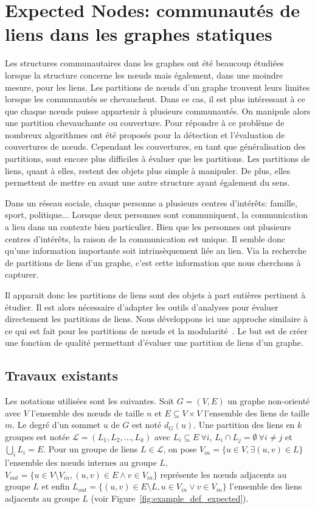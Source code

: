\chapter{Expected Nodes: communautés de liens dans les graphes statiques}
\minitoc

Les structures communautaires dans les graphes ont été beaucoup étudiées lorsque la structure concerne les n\oe uds mais également, dans une moindre mesure, pour les liens.
Les partitions de n\oe uds d'un graphe trouvent leurs limites lorsque les communautés se chevauchent.
Dans ce cas, il est plus intéressant à ce que chaque n\oe uds puisse appartenir à plusieurs communautés.
On manipule alors une partition chevauchante ou couverture.
Pour répondre à ce problème de nombreux algorithmes ont été proposés pour la détection et l'évaluation de couvertures de n\oe uds.
Cependant les couvertures, en tant que généralisation des partitions, sont encore plus difficiles à évaluer que les partitions.
Les partitions de liens, quant à elles, restent des objets plus simple à manipuler.
De plus, elles permettent de mettre en avant une autre structure ayant également du sens.

Dans un réseau sociale, chaque personne a plusieurs centres d'intérêts: famille, sport, politique...
Lorsque deux personnes sont communiquent, la communication a lieu dans un contexte bien particulier.
Bien que les personnes ont plusieurs centres d'intérêts, la raison de la communication est unique.
Il semble donc qu'une information importante soit intrinsèquement liée au lien.
Via la recherche de partitions de liens d'un graphe, c'est cette information que nous cherchons à capturer.

Il apparait donc les partitions de liens sont des objets à part entières pertinent à étudier.
Il est alors nécessaire d'adapter les outils d'analyses pour évaluer directement les partitions de liens.
Nous développons ici une approche similaire à ce qui est fait pour les partitions de n\oe uds et la modularité~\cite{Newman2004}.
Le but est de créer une fonction de qualité permettant d'évaluer une partition de liens d'un graphe.


\section{Travaux existants}
Les notations utilisées sont les suivantes. Soit $G=(V,E)$ un graphe non-orienté avec $V$ l'ensemble des n\oe uds de taille $n$ et $E \subseteq V \times V$ l'ensemble des liens de taille $m$. 
Le degré d'un sommet $u$ de $G$ est noté $d_G(u)$.
Une partition des liens en $k$ groupes est notée $\mathcal{L}=(L_1,L_2,\ldots,L_k)$ avec $L_i \subseteq E \ \forall i$, $L_i\cap L_j=\emptyset \ \forall i\neq j$ et $\bigcup_i L_i=E$.
Pour un groupe de liens $L \in \mathcal{L}$, on pose $V_{in}=\{u \in V, \exists (u,v) \in L\}$ l'ensemble des n\oe uds internes au groupe $L$, $V_{out}=\{u \in V\setminus V_{in}, (u,v) \in E \wedge v \in V_{in} \}$ représente les n\oe uds adjacents au groupe $L$ et enfin $L_{out}=\{(u,v) \in E \setminus L, u \in V_{in} \vee v \in V_{in} \}$ l'ensemble des liens adjacents au groupe $L$ (voir Figure~\ref{fig:example_def_expected}).

